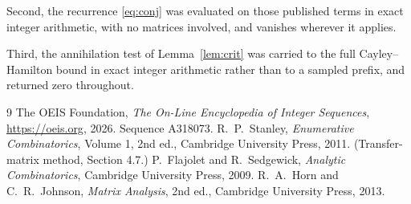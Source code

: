 \documentclass[11pt,a4paper]{article}
\theoremstyle{plain}
\theoremstyle{definition}
\begin{document}
Second, the recurrence \eqref{eq:conj} was evaluated on those published terms in exact
integer arithmetic, with no matrices involved, and vanishes wherever it applies.

Third, the annihilation test of Lemma~\ref{lem:crit} was carried to the full
Cayley--Hamilton bound in exact integer arithmetic rather than to a sampled prefix, and
returned zero throughout.

\begin{thebibliography}{9}
 The OEIS Foundation, \emph{The On-Line Encyclopedia of Integer
Sequences}, \url{https://oeis.org}, 2026. Sequence A318073.
 R.~P.~Stanley, \emph{Enumerative Combinatorics}, Volume 1, 2nd ed.,
Cambridge University Press, 2011. (Transfer-matrix method, Section 4.7.)
 P.~Flajolet and R.~Sedgewick, \emph{Analytic Combinatorics}, Cambridge
University Press, 2009.
 R.~A.~Horn and C.~R.~Johnson, \emph{Matrix Analysis}, 2nd ed., Cambridge
University Press, 2013.
\end{thebibliography}
\end{document}
